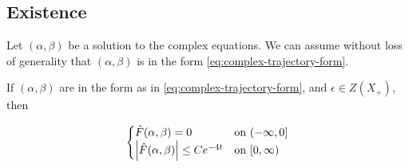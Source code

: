 \documentclass{report}
\begin{document}
\subsection{Existence}

Let \((\alpha, \beta)\) be a solution to the complex equations. We can assume without loss of generality that \((\alpha, \beta)\) is in the form \cref{eq:complex-trajectory-form}.

\begin{lemma}
    \label{lem:existence-bound}

    If \((\alpha, \beta)\) are in the form as in \cref{eq:complex-trajectory-form}, and \(\epsilon \in Z(X_+)\), then

    \[
    \begin{cases}
        \hat F(\alpha, \beta) = 0 & \text{on }(-\infty, 0] \\
        \abs{\hat F(\alpha, \beta)} \le Ce^{-4t} & \text{on }[0, \infty)
    \end{cases}\]
\end{lemma}
\end{document}
